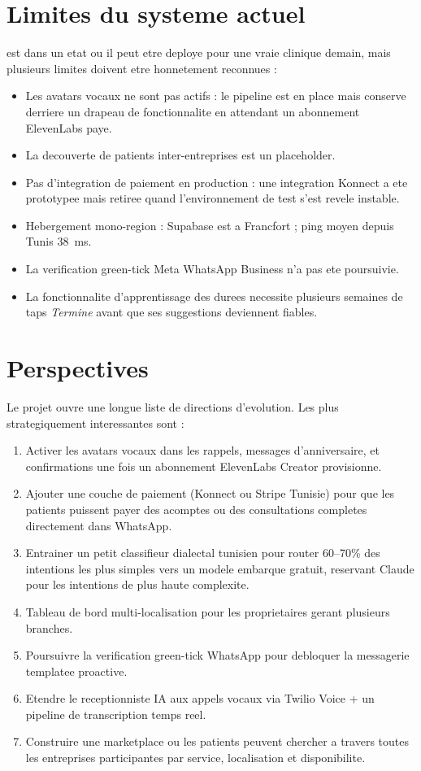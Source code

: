 \section*{Limites du systeme actuel}
\nova{} est dans un etat ou il peut etre deploye pour une vraie
clinique demain, mais plusieurs limites doivent etre honnetement
reconnues :
\begin{itemize}
  \item Les avatars vocaux ne sont pas actifs : le pipeline est en
        place mais conserve derriere un drapeau de fonctionnalite en
        attendant un abonnement ElevenLabs paye.
  \item La decouverte de patients inter-entreprises est un placeholder.
  \item Pas d'integration de paiement en production : une integration
        Konnect a ete prototypee mais retiree quand l'environnement de
        test s'est revele instable.
  \item Hebergement mono-region : Supabase est a Francfort ; ping moyen
        depuis Tunis 38~ms.
  \item La verification green-tick Meta WhatsApp Business n'a pas ete
        poursuivie.
  \item La fonctionnalite d'apprentissage des durees necessite plusieurs
        semaines de taps \emph{Termine} avant que ses suggestions
        deviennent fiables.
\end{itemize}

\section*{Perspectives}
Le projet ouvre une longue liste de directions d'evolution. Les plus
strategiquement interessantes sont :

\begin{enumerate}
  \item Activer les avatars vocaux dans les rappels, messages
        d'anniversaire, et confirmations une fois un abonnement
        ElevenLabs Creator provisionne.
  \item Ajouter une couche de paiement (Konnect ou Stripe Tunisie)
        pour que les patients puissent payer des acomptes ou des
        consultations completes directement dans WhatsApp.
  \item Entrainer un petit classifieur dialectal tunisien pour router
        60--70\% des intentions les plus simples vers un modele
        embarque gratuit, reservant Claude pour les intentions de
        plus haute complexite.
  \item Tableau de bord multi-localisation pour les proprietaires
        gerant plusieurs branches.
  \item Poursuivre la verification green-tick WhatsApp pour
        debloquer la messagerie templatee proactive.
  \item Etendre le receptionniste IA aux appels vocaux via Twilio
        Voice + un pipeline de transcription temps reel.
  \item Construire une marketplace ou les patients peuvent chercher a
        travers toutes les entreprises participantes par service,
        localisation et disponibilite.
\end{enumerate}

